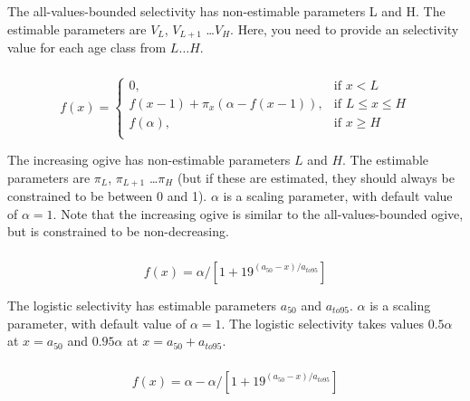 The all-values-bounded selectivity has non-estimable parameters L and H. The estimable parameters are $V_L$, $V_{L+1}$ \ldots $V_H$. Here, you need to provide an selectivity value for each age class from $L \ldots H$.

\subsubsection[Increasing]{}

\begin{equation} 
f(x)=\begin{cases}
	  0, & \text{if $x < L$} \\
	  f(x-1)+ \pi_x(\alpha-f(x-1)), & \text{if $L \le x \le H$} \\
	  f(\alpha), & \text{if $x \ge H$} \\  
  \end{cases}
\end{equation}

The increasing ogive has non-estimable parameters $L$ and $H$. The estimable parameters are $\pi_L$, $\pi_{L+1}$ \ldots $\pi_H$ (but if these are estimated, they should always be constrained to be between 0 and 1). $\alpha$ is a scaling parameter, with default value of $\alpha = 1$. Note that the increasing ogive is similar to the all-values-bounded ogive, but is constrained to be non-decreasing.

\subsubsection[Logistic]{}

\begin{equation}
  f(x) = \alpha / [1+19^{(a_{50}-x)/a_{to95}}]
\end{equation}
 
The logistic selectivity has estimable parameters $a_{50}$ and $a_{to95}$. $\alpha$ is a scaling parameter, with default value of $\alpha = 1$. The logistic selectivity takes values $0.5 \alpha$ at $x=a_{50}$ and $0.95 \alpha$ at $x=a_{50}+a_{to95}$. 

\subsubsection[Inverse logistic]{}

\begin{equation}
  f(x) = \alpha - \alpha / [1+19^{(a_{50}-x)/a_{to95}}]
\end{equation}
 
